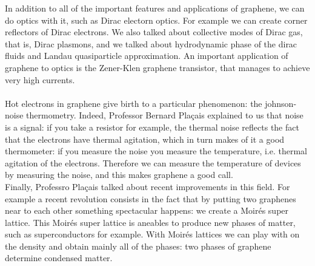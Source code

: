 \documentclass[12pt,a4paper]{article}
\begin{document}
In addition to all of the important features and applications of graphene, we can do optics with it, such as Dirac electorn optics. For example we can create corner reflectors of Dirac electrons. We also talked about collective modes of Dirac gas, that is, Dirac plasmons, and we talked about hydrodynamic phase of the dirac fluids and Landau quasiparticle approximation. An important application of graphene to optics is the Zener-Klen graphene transistor, that manages to achieve very high currents. \\\\
Hot electrons in graphene give birth to a particular phenomenon: the johnson-noise thermometry. Indeed, Professor Bernard Plaçais explained to us that noise is a signal: if you take a resistor for example, the thermal noise reflects the fact that the electrons have thermal agitation, which in turn makes of it a good thermometer: if you measure the noise you measure the temperature, i.e. thermal agitation of the electrons. Therefore we can measure the temperature of devices by measuring the noise, and this makes graphene a good call. \\
Finally, Professro Plaçais talked about recent improvements in this field. For example a recent revolution consists in the fact that by putting two graphenes near to each other something spectacular happens: we create a Moirés super lattice. This Moirés super lattice is aneables to produce new phases of matter, such as superconductors for example. With Moirés lattices we can play with on the density and obtain mainly all of the phases: two phases of graphene determine condensed matter. 
\end{document}
